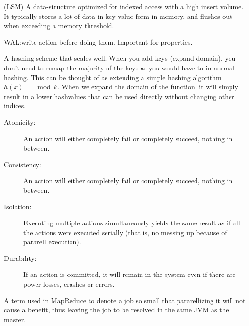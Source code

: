 \begin{definition}\label{def:LSM}
    (LSM) A data-structure optimized for indexed access with a high insert volume.
    It typically stores a lot of data in key-value form in-memory, and flushes out
    when exceeding a memory threshold.
\end{definition}

\begin{definition}\label{def:WAL}
    WAL:\@ write action before doing them. Important for  properties.
\end{definition}

\begin{definition}\label{def:consistenthashing}
    A hashing scheme that scales well. When you add keys (expand domain), you don't need to
    remap the majority of the keys as you would have to in normal hashing.
    This can be thought of as extending a simple hashing algorithm $h(x) = \mod k$.
    When we expand the domain of the function, it will simply result in a lower hashvalues that can
    be used directly without changing other indices.
\end{definition}

\begin{definition}[ACID]\label{def:acid}
    \begin{description}
        \item[Atomicity:] An action will either completely fail or completely succeed, nothing  in between.
        \item[Consistency:] An action will either completely fail or completely succeed, nothing  in between.
        \item[Isolation:] Executing multiple actions simultaneously yields the same result as if all the actions
            were executed serially (that is, no messing up because of pararell execution).
        \item[Durability:] If an action is committed, it will remain in the system even if there are
            power losses, crashes or errors.
    \end{description}
\end{definition}

\begin{definition}\label{def:ubertask}
    A term used in MapReduce to denote a job so small that pararellizing it
    will not cause a benefit, thus leaving the job to be resolved in the same JVM 
    as the master.
\end{definition}


